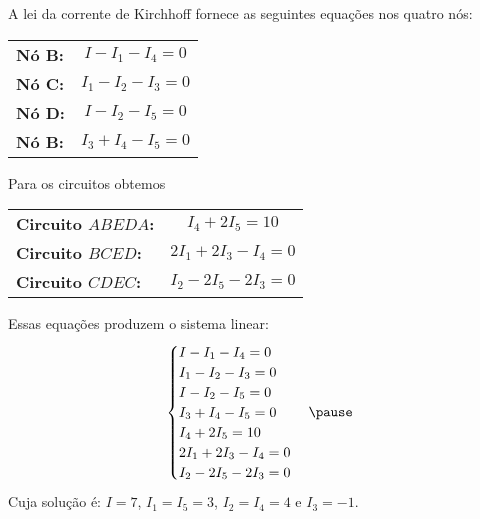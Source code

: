 \documentclass{beamer}
\begin{document}
    \begin{frame}
        \begin{figure}[!h]
            \centering
            
        \end{figure}
    \end{frame}

    \begin{frame}
        A lei da corrente de Kirchhoff \pause fornece as seguintes equações nos quatro nós:\pause
        \begin{center}
            \begin{tabular}{lc}
                \textbf{Nó B:} \pause & $I - I_1 - I_4 = 0$\pause\\
                \textbf{Nó C:} \pause & $I_1 - I_2 - I_3 = 0$\pause\\
                \textbf{Nó D:} \pause & $I - I_2 - I_5 = 0$\pause\\
                \textbf{Nó B:} \pause & $I_3 + I_4 - I_5 = 0$\pause
            \end{tabular}
        \end{center}

        Para os circuitos obtemos
        \begin{center}
            \begin{tabular}{lc}
                \textbf{Circuito $ABEDA$:} \pause & $I_4 + 2I_5 = 10$\pause\\
                \textbf{Circuito $BCED$:} \pause & $2I_1 + 2I_3 - I_4 = 0$\pause\\
                \textbf{Circuito $CDEC$:} \pause & $I_2 - 2I_5 - 2I_3 = 0$
            \end{tabular}
        \end{center}
    \end{frame}

    \begin{frame}
        Essas equações produzem o sistema linear:
        \[
            \begin{cases}
                I - I_1 - I_4 = 0\\
                I_1 - I_2 - I_3 = 0\\
                I - I_2 - I_5 = 0\\
                I_3 + I_4 - I_5 = 0\\
                I_4 + 2I_5 = 10\\
                2I_1 + 2I_3 - I_4 = 0\\
                I_2 - 2I_5 - 2I_3 = 0
            \end{cases}\pause
        \]
        Cuja solução é: $I = 7$, $I_1 = I_5 = 3$, $I_2 = I_4 = 4$ e $I_3 = -1$.
    \end{frame}
\end{document}
